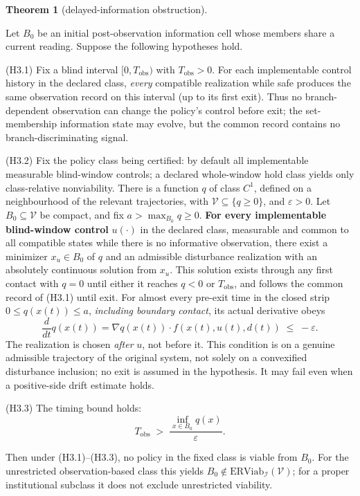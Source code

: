 \documentclass[11pt]{article}
\theoremstyle{definition}
\newtheorem{theorem}{Theorem}
\begin{document}
\begin{theorem}[delayed-information obstruction]\label{thm:delayed}

Let \(B_0\) be an initial post-observation information cell whose
members share a current reading. Suppose the following
hypotheses hold.

(H3.1) Fix a blind interval \([0,T_{\mathrm{obs}})\) with
\(T_{\mathrm{obs}}>0\). For each implementable control history in the
declared class, \emph{every} compatible realization while safe produces
the same observation record on this interval (up to its first exit).
Thus no branch-dependent observation can change the policy's control
before exit; the set-membership information state may evolve, but the
common record contains no branch-discriminating signal.

(H3.2) Fix the policy class being certified: by default all implementable measurable blind-window controls; a declared whole-window hold class yields only class-relative nonviability. There is a function \(q\) of class \(C^1\), defined on a neighbourhood of
the relevant trajectories, with \(\mathcal V\subseteq\{q\ge0\}\),
and \(\varepsilon>0\). Let \(B_0\subseteq\mathcal V\) be compact,
and fix \(a>\max_{B_0}q\ge0\).
\textbf{For every implementable blind-window control} \(u(\cdot)\) in the
declared class, measurable and common to all compatible states while
there is no informative observation, there exist a minimizer
\(x_u\in B_0\) of \(q\) and an admissible disturbance realization
with an absolutely continuous solution from \(x_u\). This solution
exists through any first contact with \(q=0\) until either it reaches
\(q<0\) or \(T_{\mathrm{obs}}\), and follows the common record
of (H3.1) until exit. For almost every pre-exit time in the closed strip
\(0\le q(x(t))\le a\), \emph{including boundary contact},
its actual derivative obeys
\[\frac{d}{dt}q(x(t))=\nabla q(x(t))\cdot f(x(t),u(t),d(t))
\;\le\;-\varepsilon. \tag{2}\]
The realization is chosen \emph{after} \(u\), not before it. This
condition is on a genuine admissible trajectory of the original system,
not solely on a convexified disturbance inclusion; no exit is assumed
in the hypothesis. It may fail even when a positive-side drift estimate
holds.

(H3.3) The timing bound holds:
\[T_{\mathrm{obs}} \;>\; \frac{\inf_{x \in B_0} q(x)}{\varepsilon}. \tag{3}\]

Then under (H3.1)--(H3.3), no policy in the fixed class is viable
from \(B_0\). For the unrestricted observation-based class this yields
\(B_0\notin\mathrm{ERViab}_{\mathcal I}(\mathcal V)\); for a proper
institutional subclass it does not exclude unrestricted viability.

\end{theorem}
\end{document}
